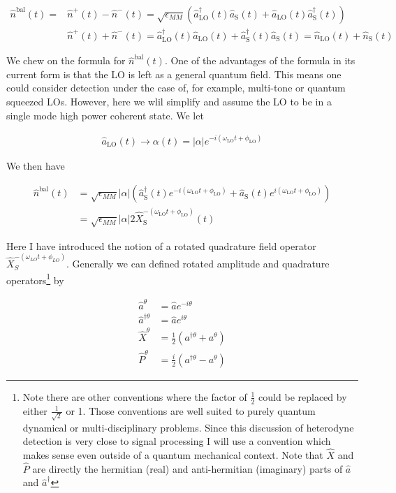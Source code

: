 \documentclass[12pt]{article}
\newcommand{\ep}{\epsilon}
\begin{document}
\begin{align}
\hat{n}^{\text{bal}}(t) = &\hat{n}^+(t) - \hat{n}^-(t) = \sqrt{\ep_{MM}} \left(\hat{a}^{\dag}_{\text{LO}}(t)\hat{a}_{\text{S}}(t) + \hat{a}_{\text{LO}}(t)\hat{a}^{\dag}_{\text{S}}(t) \right)\\
&\hat{n}^+(t) + \hat{n}^-(t) = \hat{a}^{\dag}_{\text{LO}}(t) \hat{a}_{\text{LO}}(t) + \hat{a}^{\dag}_{\text{S}}(t) \hat{a}_{\text{S}}(t) = \hat{n}_{\text{LO}}(t) + \hat{n}_{\text{S}}(t)
\end{align}

We chew on the formula for $\hat{n}^{\text{bal}}(t)$. One of the advantages of the formula in its current form is that the LO is left as a general quantum field. This means one could consider detection under the case of, for example, multi-tone or quantum squeezed LOs. However, here we wlil simplify and assume the LO to be in a single mode high power coherent state. We let 

\begin{align}
\hat{a}_{\text{LO}}(t) \rightarrow \alpha(t) = |\alpha|e^{-i(\omega_{\text{LO}}t + \phi_{\text{LO}})}
\end{align}

We then have

\begin{align}
\label{eq:quadformula}
\hat{n}^{\text{bal}}(t) &= \sqrt{\ep_{MM}} |\alpha| \left(\hat{a}^{\dag}_{\text{S}}(t) e^{-i(\omega_{\text{LO}}t + \phi_{\text{LO}})}  + \hat{a}_{\text{S}}(t) e^{i(\omega_{\text{LO}}t + \phi_{\text{LO}})} \right)\\
&=\sqrt{\ep_{MM}}|\alpha|2\hat{X}_{\text{S}}^{-(\omega_{\text{LO}}t + \phi_{\text{LO}})}(t)
\end{align}

Here I have introduced the notion of a rotated quadrature field operator $\hat{X}_S^{-(\omega_{LO}t + \phi_{LO})}$. Generally we can defined rotated amplitude and quadrature operators\footnote{Note there are other conventions where the factor of $\frac{1}{2}$ could be replaced by either $\frac{1}{\sqrt{2}}$ or 1. Those conventions are well suited to purely quantum dynamical or multi-disciplinary problems. Since this discussion of heterodyne detection is very close to signal processing I will use a convention which makes sense even outside of a quantum mechanical context. Note that $\hat{X}$ and $\hat{P}$ are directly the hermitian (real) and anti-hermitian (imaginary) parts of $\hat{a}$ and $\hat{a}^{\dag}$} by

\begin{align}
\hat{a}^{\theta} &= \hat{a}e^{-i\theta}\\
\hat{a}^{\dag\theta} &= \hat{a}e^{i\theta}\\
\hat{X}^{\theta} &= \frac{1}{2}\left(a^{\dag\theta} + a^{\theta} \right)\\
\hat{P}^{\theta} &= \frac{i}{2}\left(a^{\dag\theta} - a^{\theta} \right)
\end{align}
\end{document}
